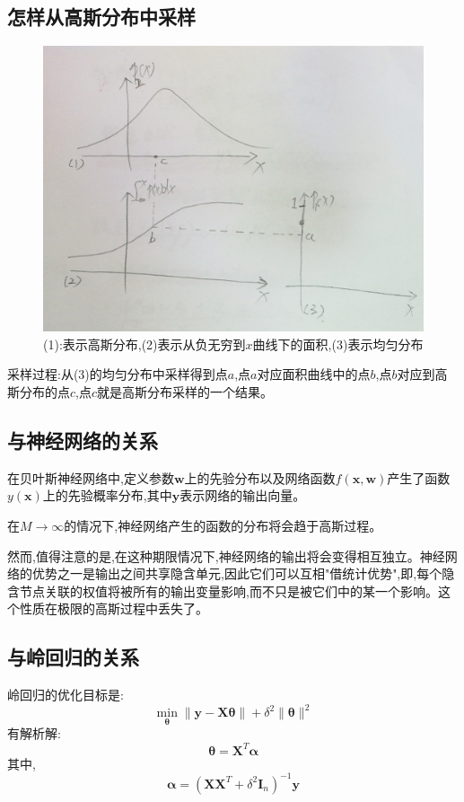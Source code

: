 \documentclass[UTF8,a4paper]{ctexart}
\begin{document}
        \subsection{怎样从高斯分布中采样}

        \begin{figure}[H]\centering
            \includegraphics[scale = 0.2]{assets/GaussianProcess_16efa.png}
            \caption{(1):表示高斯分布,(2)表示从负无穷到$x$曲线下的面积,(3)表示均匀分布}
        \end{figure}
        采样过程:从(3)的均匀分布中采样得到点$a$,点$a$对应面积曲线中的点$b$,点$b$对应到高斯分布的点$c$,点$c$就是高斯分布采样的一个结果。

        \subsection{与神经网络的关系}
        在贝叶斯神经网络中,定义参数$\bm w$上的先验分布以及网络函数$f(\bm x,\bm w)$产生了函数$y(\bm x)$上的先验概率分布,其中$\bm y$表示网络的输出向量。

        在$M\to \infty $的情况下,神经网络产生的函数的分布将会趋于高斯过程。

        然而,值得注意的是,在这种期限情况下,神经网络的输出将会变得相互独立。神经网络的优势之一是输出之间共享隐含单元,因此它们可以互相"借统计优势",即,每个隐含节点关联的权值将被所有的输出变量影响,而不只是被它们中的某一个影响。这个性质在极限的高斯过程中丢失了。

        \subsection{与岭回归的关系}
        岭回归的优化目标是:
        \begin{equation}
            \min_{\bm \theta} \|\bm y - \bm X\bm \theta\| + \delta^2\|\bm \theta\|^2
        \end{equation}
        有解析解:
        \begin{equation}
            \bm \theta = \bm X^T \bm \alpha
        \end{equation}
        其中,
        \begin{equation}
            \bm \alpha = (\bm X\bm X^T + \delta^2 \bm I_n)^{-1}\bm y
        \end{equation}
\end{document}
